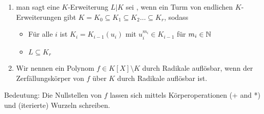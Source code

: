 \documentclass[../main.tex]{subfiles}
\begin{document}
\begin{definition}$ $
    \begin{enumerate}[label=(\roman*)]
        \item man sagt eine $K$-Erweiterung $L|K$ sei , wenn ein Turm von endlichen $K$-Erweiterungen gibt $K=K_0\subseteq K_1\subseteq K_2\dots\subseteq K_r$, sodass
        \begin{itemize}
            \item Für alle $i$ ist $K_i=K_{i-1}(u_i)$ mit $u_i^{m_i}\in K_{i-1}$ für $m_i\in\mathbb{N}$
            \item $L\subseteq K_r$
        \end{itemize}
        \item Wir nennen ein Polynom $f\in K[X]\setminus K$ durch Radikale auflösbar, wenn der Zerfällungskörper von $f$ über $K$ durch Radikale auflösbar ist.
    \end{enumerate}
\end{definition}
Bedeutung:
Die Nullstellen von $f$ lassen sich mittels Körperoperationen (+ and *) und (iterierte) Wurzeln schreiben.
\end{document}
